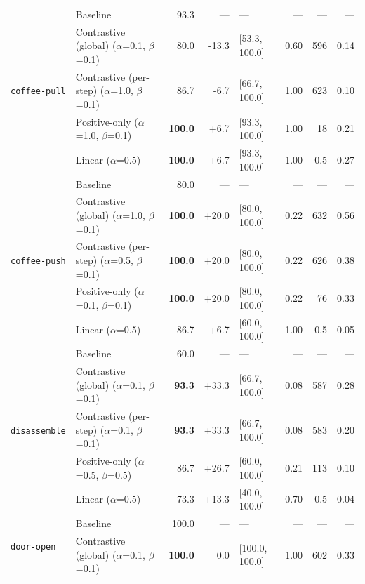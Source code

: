\begin{table}[p]
{\begin{tabular}{@{}ll r r l r r r@{}}
\midrule
  \multirow{5}{*}{\texttt{coffee-pull}} & Baseline & 93.3 & --- & --- & --- & --- & --- \\
   & Contrastive (global) \scriptsize{($\alpha$=0.1, $\beta$=0.1)} & 80.0 & -13.3 & [53.3, 100.0] & 0.60 & 596 & 0.14 \\
   & Contrastive (per-step) \scriptsize{($\alpha$=1.0, $\beta$=0.1)} & 86.7 & -6.7 & [66.7, 100.0] & 1.00 & 623 & 0.10 \\
   & Positive-only \scriptsize{($\alpha$=1.0, $\beta$=0.1)} & \textbf{100.0} & +6.7 & [93.3, 100.0] & 1.00 & 18 & 0.21 \\
   & Linear \scriptsize{($\alpha$=0.5)} & \textbf{100.0} & +6.7 & [93.3, 100.0] & 1.00 & 0.5 & 0.27 \\
\midrule
  \multirow{5}{*}{\texttt{coffee-push}} & Baseline & 80.0 & --- & --- & --- & --- & --- \\
   & Contrastive (global) \scriptsize{($\alpha$=1.0, $\beta$=0.1)} & \textbf{100.0} & +20.0 & [80.0, 100.0] & 0.22 & 632 & 0.56 \\
   & Contrastive (per-step) \scriptsize{($\alpha$=0.5, $\beta$=0.1)} & \textbf{100.0} & +20.0 & [80.0, 100.0] & 0.22 & 626 & 0.38 \\
   & Positive-only \scriptsize{($\alpha$=0.1, $\beta$=0.1)} & \textbf{100.0} & +20.0 & [80.0, 100.0] & 0.22 & 76 & 0.33 \\
   & Linear \scriptsize{($\alpha$=0.5)} & 86.7 & +6.7 & [60.0, 100.0] & 1.00 & 0.5 & 0.05 \\
\midrule
  \multirow{5}{*}{\texttt{disassemble}} & Baseline & 60.0 & --- & --- & --- & --- & --- \\
   & Contrastive (global) \scriptsize{($\alpha$=0.1, $\beta$=0.1)} & \textbf{93.3} & +33.3 & [66.7, 100.0] & 0.08 & 587 & 0.28 \\
   & Contrastive (per-step) \scriptsize{($\alpha$=0.1, $\beta$=0.1)} & \textbf{93.3} & +33.3 & [66.7, 100.0] & 0.08 & 583 & 0.20 \\
   & Positive-only \scriptsize{($\alpha$=0.5, $\beta$=0.5)} & 86.7 & +26.7 & [60.0, 100.0] & 0.21 & 113 & 0.10 \\
   & Linear \scriptsize{($\alpha$=0.5)} & 73.3 & +13.3 & [40.0, 100.0] & 0.70 & 0.5 & 0.04 \\
\midrule
  \multirow{5}{*}{\texttt{door-open}} & Baseline & 100.0 & --- & --- & --- & --- & --- \\
   & Contrastive (global) \scriptsize{($\alpha$=0.1, $\beta$=0.1)} & \textbf{100.0} & 0.0 & [100.0, 100.0] & 1.00 & 602 & 0.33 \\

\end{tabular}}
\end{table}
